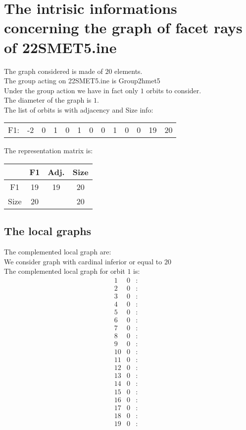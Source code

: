 \documentclass[12pt]{article}
\begin{document}
\section{The intrisic informations concerning the graph of facet rays of 22SMET5.ine}
The graph considered is made of $20$ elements.\\
The group acting on 22SMET5.ine is Group2hmet5\\
Under the group action we have in fact only $1$ orbits to consider.\\
The diameter of the graph is $1$.\\
The list of orbits is with adjacency and Size info:
\begin{center}
\scriptsize
\begin{tabular}{ccccccccccc|c|c}
F1:&-2&0&1&0&1&0&0&1&0&0&19&20\\
\end{tabular}
\end{center}
The representation matrix is:
\begin{center}
\scriptsize
\begin{tabular}{|c|c|c|c|}
\hline
&F1&Adj.&Size\\
\hline
F1& 19&19&20\\
\hline
Size&20&&20\\
\hline
\end{tabular}
\end{center}
\subsection{The local graphs}
The complemented local graph are:\\
We consider graph with cardinal inferior or equal to $20$\\
The complemented local graph for orbit $1$ is:
\begin{equation*}
\begin{array}{rrcl}
1&0&:&\\
2&0&:&\\
3&0&:&\\
4&0&:&\\
5&0&:&\\
6&0&:&\\
7&0&:&\\
8&0&:&\\
9&0&:&\\
10&0&:&\\
11&0&:&\\
12&0&:&\\
13&0&:&\\
14&0&:&\\
15&0&:&\\
16&0&:&\\
17&0&:&\\
18&0&:&\\
19&0&:&\\
\end{array}
\end{equation*}
\end{document}
